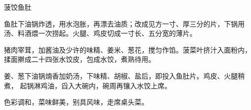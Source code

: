\begin{recipe}{菠饺鱼肚}

\ingredients


\preparation

\step 鱼肚下油锅炸透，用水泡胀，再漂去油质；改成见方一寸、厚三分的片，下锅用
汤、料酒煨一次捞起。火腿、鸡皮切成一寸长、五分宽的薄片。

\step 猪肉宰茸，加酱油及少许的味精、姜米、葱花，搅匀作馅。菠菜叶挤汁入面粉内，
揉面擀成二十四张水饺皮，包成水饺，煮熟待用。

\step 姜、葱下油锅煵香加奶汤，下味精、胡椒、盐后，即投入鱼肚片。鸡皮、火腿稍煮，
起锅淋鸡油，舀入大碗内，碗周再镶入水饺上席。

\features

色彩调和，菜味鲜美，别具风味，走席桌头菜。

\end{recipe}

